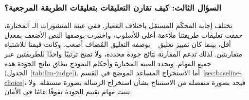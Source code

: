 \subsubsection{السؤال الثالث: كيف تقارن التعليقات بتعليقات الطريقة المرجعية؟}
تختلف إجابة المحكّم المستقل باختلاف المعيار. ففي عينة المنشورات الـ المختارة، حققت تعليقات طريقتنا ملاءمة أعلى للأسلوب، واختيرت بوصفها النص الأضعف بمعدل أقل، بينما كان تمييز تعليق ~\cite{lin2024zero} بوصفه التعليق المُضاف أصعب. وكانت قيمتا  للاشتباه متقاربتين. لذلك تدعم المقارنة نتائج جودة محددة، ولا تمنح ترتيبًا واحدًا للطريقتين عبر جميع المهام. وتحدد العينة المختارة وأحكام النموذج نطاق نتائج الجودة هذه (الجدول~\ref{tab:llm-judge}). أما الاستخراج المساعد الموضح في القسم~\ref{sec:baseline-choice}، فيحد بصورة منفصلة من الاستنتاج بشأن استخراج الرسالة بصورة مستقلة. ولا تثبت مهام تقييم الجودة تفوقًا عامًا في الأمان.
